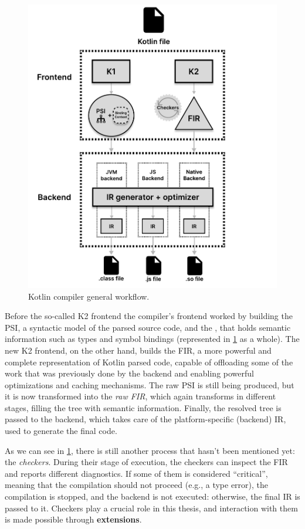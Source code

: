 \documentclass[12pt,a4paper,openright,twoside]{book}
\begin{document}
\begin{figure}
  \centering
  \includegraphics[width=.9\linewidth]{figures/kotlin-compiler-workflow.pdf}
  \caption{Kotlin compiler general workflow.}
  \label{fig:kotlin-compiler-workflow}
\end{figure}

Before the so-called K2 frontend the compiler's frontend worked by
building the \ac{PSI}, a syntactic model of the parsed source code, and the
, that holds semantic information such as types and
symbol bindings (represented in \cref{fig:kotlin-compiler-workflow} as a whole). 
%
The new K2 frontend, on the other hand, builds the \ac{FIR}, a more powerful and
complete representation of Kotlin parsed code, capable of offloading some of the
work that was previously done by the backend and enabling powerful optimizations
and caching mechanisms. The raw \ac{PSI} is still being produced, but it is now
transformed into the \emph{raw FIR}, which again transforms in different stages,
filling the tree with semantic information. Finally, the resolved tree is passed
to the backend, which takes care of the platform-specific (backend) \ac{IR}, used
to generate the final code.

As we can see in \cref{fig:kotlin-compiler-workflow}, there is still another
process that hasn't been mentioned yet: the \emph{checkers}. During their stage
of execution, the checkers can inspect the \ac{FIR} and reports different
diagnostics. If some of them is considered ``critical'', meaning that the
compilation should not proceed (e.g., a type error), the compilation is stopped,
and the backend is not executed: otherwise, the final \ac{IR} is passed to it.
%
Checkers play a crucial role in this thesis, and interaction with them is made
possible through \textbf{extensions}.
\end{document}
